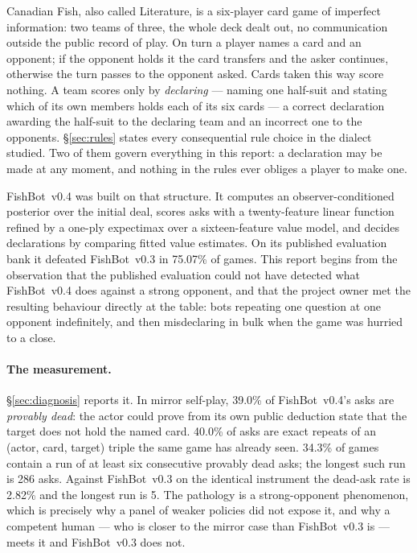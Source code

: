 \documentclass[11pt]{article}
\theoremstyle{definition}
\DeclareRobustCommand{\vfour}{\texorpdfstring{\mbox{FishBot v0.4}}{FishBot v0.4}}
\DeclareRobustCommand{\vthree}{\texorpdfstring{\mbox{FishBot v0.3}}{FishBot v0.3}}
\providecommand{\numDeadAsk}{39.0}
\providecommand{\numRepeatAsk}{40.0}
\providecommand{\numDeadRunLongest}{286}
\providecommand{\numDeadRunGames}{34.3}
\providecommand{\numVthreeDeadAsk}{2.82}
\providecommand{\numVthreeDeadRun}{5}
\providecommand{\numVfourVsVthree}{75.07}
\begin{document}
Canadian Fish, also called Literature, is a six-player card game of imperfect
information: two teams of three, the whole deck dealt out, no communication
outside the public record of play. On turn a player names a card and an opponent;
if the opponent holds it the card transfers and the asker continues, otherwise
the turn passes to the opponent asked. Cards taken this way score nothing. A team
scores only by \emph{declaring} --- naming one half-suit and stating which of its
own members holds each of its six cards --- a correct declaration awarding the
half-suit to the declaring team and an incorrect one to the opponents.
\S\ref{sec:rules} states every consequential rule choice in the dialect studied.
Two of them govern everything in this report: a declaration may be made at any
moment, and nothing in the rules ever obliges a player to make one.

\vfour{} \cite{fishbot04} was built on that structure. It computes an
observer-conditioned posterior over the initial deal, scores asks with a
twenty-feature linear function refined by a one-ply expectimax over a
sixteen-feature value model, and decides declarations by comparing fitted value
estimates. On its published evaluation bank it defeated \vthree{} \cite{fishbot03} in
\numVfourVsVthree\% of games. This report begins from the observation that the
published evaluation could not have detected what \vfour{} does against a strong
opponent, and that the project owner met the resulting behaviour directly at the
table: bots repeating one question at one opponent indefinitely, and then
misdeclaring in bulk when the game was hurried to a close.

\paragraph{The measurement.} \S\ref{sec:diagnosis} reports it. In mirror
self-play, \numDeadAsk\% of \vfour{}'s asks are \emph{provably dead}: the actor
could prove from its own public deduction state that the target does not hold
the named card. \numRepeatAsk\% of asks are exact repeats of an
(actor, card, target) triple the same game has already seen.
\numDeadRunGames\% of games contain a run of at least six consecutive provably
dead asks; the longest such run is \numDeadRunLongest{} asks. Against \vthree{}
on the identical instrument the dead-ask rate is \numVthreeDeadAsk\% and the
longest run is \numVthreeDeadRun{}. The pathology is a strong-opponent
phenomenon, which is precisely why a panel of weaker policies did not expose it,
and why a competent human --- who is closer to the mirror case than \vthree{} is
--- meets it and \vthree{} does not.
\end{document}

